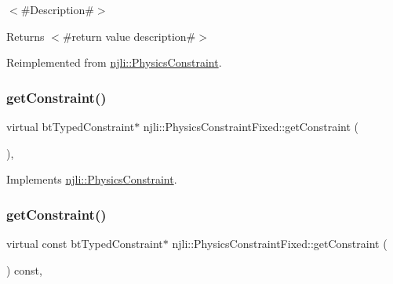 $<$\#\+Description\#$>$

\begin{DoxyReturn}{Returns}
$<$\#return value description\#$>$ 
\end{DoxyReturn}


Reimplemented from \mbox{\hyperlink{classnjli_1_1_physics_constraint_a4d31c5267199972942d66b3480374010}{njli\+::\+Physics\+Constraint}}.

\mbox{\label{classnjli_1_1_physics_constraint_fixed_aacec008844d5aa73eb2763855607a688}} 
\subsubsection{\texorpdfstring{get\+Constraint()}{getConstraint()}\hspace{0.1cm}{\footnotesize\ttfamily [1/2]}}
{\footnotesize\ttfamily virtual bt\+Typed\+Constraint$\ast$ njli\+::\+Physics\+Constraint\+Fixed\+::get\+Constraint (\begin{DoxyParamCaption}{ }\end{DoxyParamCaption})\hspace{0.3cm}{\ttfamily [protected]}, {\ttfamily [virtual]}}



Implements \mbox{\hyperlink{classnjli_1_1_physics_constraint_a0a22d54c2c896af49fa57db9be76a5da}{njli\+::\+Physics\+Constraint}}.

\mbox{\label{classnjli_1_1_physics_constraint_fixed_acd6e7d3872dc19e5bab285fddc2fb2f3}} 
\subsubsection{\texorpdfstring{get\+Constraint()}{getConstraint()}\hspace{0.1cm}{\footnotesize\ttfamily [2/2]}}
{\footnotesize\ttfamily virtual const bt\+Typed\+Constraint$\ast$ njli\+::\+Physics\+Constraint\+Fixed\+::get\+Constraint (\begin{DoxyParamCaption}{ }\end{DoxyParamCaption}) const\hspace{0.3cm}{\ttfamily [protected]}, {\ttfamily [virtual]}}



